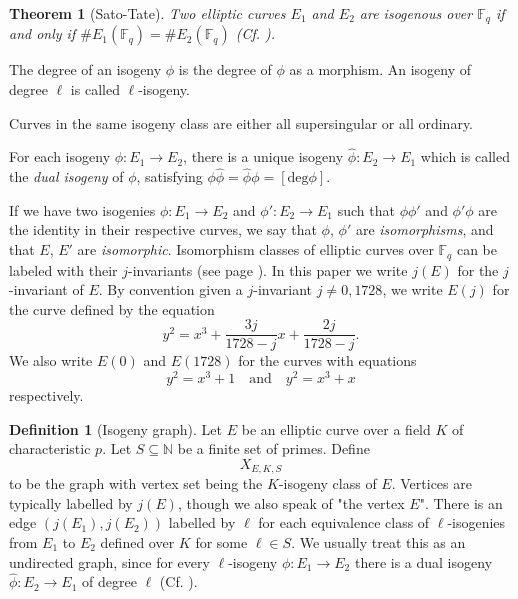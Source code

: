 \documentclass{article}
\theoremstyle{theorem}
\newtheorem{theorem}{Theorem}
\theoremstyle{definition}
\newtheorem{definition}{Definition}
\begin{document}
\begin{theorem}[Sato-Tate]
	Two elliptic curves $E_1$ and $E_2$ are isogenous over $\mathbb{F}_q$ if and only if $\#E_1(\mathbb{F}_q) = \#E_2(\mathbb{F}_q)$ (Cf. \cite[Theorem 13]{IsogenyCryptoDeFeo}). 
\end{theorem}  

The degree of an isogeny $\phi$ is the degree of $\phi$ as a morphism. An isogeny of degree $\ell$ is called $\ell$-isogeny. 

Curves in the same isogeny class are either all supersingular or all ordinary.



For each isogeny $\phi: E_1 \to E_2$, there is a unique isogeny $\hat{\phi}: E_2 \to E_1$ which is called the \textit{dual isogeny} of $\phi$, satisfying $\phi\hat{\phi} = \hat{\phi}\phi = [\mathrm{deg}\phi]$. 

If we have two isogenies $\phi: E_1 \to E_2$ and $\phi': E_2 \to E_1$ such that $\phi\phi'$ and $\phi'\phi$ are the identity in their respective curves, we say that $\phi$, $\phi'$ are \textit{isomorphisms}, and that $E$, $E'$ are \textit{isomorphic}. Isomorphism classes of elliptic curves over $\mathbb{F}_q$ can be labeled with their $j$-invariants (see page \pageref{j-invariant}). In this paper we write $j(E)$ for the $j$-invariant of $E$. By convention given a $j$-invariant $j \neq 0, 1728$, we write $E(j)$ for the curve defined by the equation 
	\[y^2 = x^3 + \frac{3j}{1728 - j}x + \frac{2j}{1728 - j}. \]
We also write $E(0)$ and $E(1728)$ for the curves with equations
	\[y^2 = x^3 + 1 \quad \text{and} \quad y^2 = x^3 +x \]
respectively.

	\begin{definition}[Isogeny graph]
		Let $E$ be an elliptic curve over a field $K$ of characteristic $p$. Let $S \subseteq \mathbb{N}$ be a finite set of primes. Define
			\[X_{E, K, S} \]
		to be the graph with vertex set being the $K$-isogeny class of $E$. Vertices are typically labelled by $j(E)$, though we also speak of "the vertex $E$". There is an edge $(j(E_1), j(E_2))$ labelled by $\ell$ for each equivalence class of $\ell$-isogenies from $E_1$ to $E_2$ defined over $K$ for some $\ell \in S$. We usually treat this as an undirected graph, since for every $\ell$-isogeny $\phi: E_1 \to E_2$ there is a dual isogeny $\hat{\phi}: E_2 \to E_1$ of degree $\ell$ (Cf. \cite[25.2]{Galbraith-PKC}). 
	\end{definition}
\end{document}
